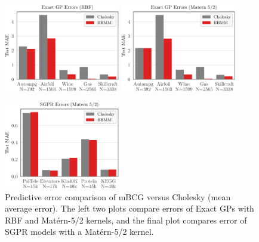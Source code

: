 \begin{figure}[t]
  \centering
  \includegraphics[width=0.45\textwidth]{figures/bbmm_error_exact_gp_RBF.pdf}
  \quad
  \includegraphics[width=0.45\textwidth]{figures/bbmm_error_exact_gp_Matern.pdf}
  \vspace{1em}

  \includegraphics[width=0.45\textwidth]{figures/bbmm_error_sgpr_Matern.pdf}
  \caption[Predictive error comparison of mBCG versus Cholesky.]{
		Predictive error comparison of mBCG versus Cholesky (mean average error).
		The left two plots compare errors of Exact GPs with RBF and Mat\'ern-5/2 kernels,
		and the final plot compares error of SGPR models with a Mat\'ern-5/2 kernel.
	}
  \label{fig:bbmm_error_results}
\end{figure}

